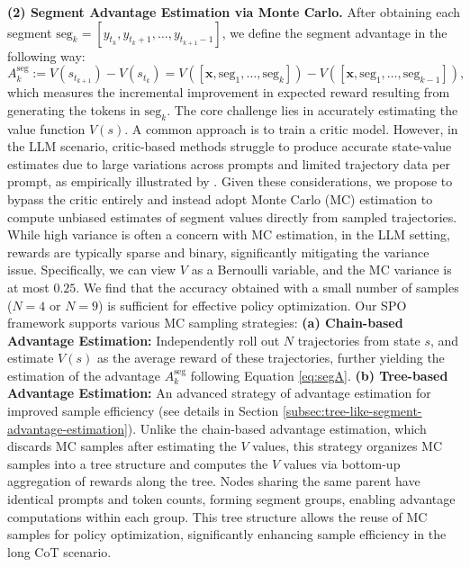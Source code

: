 \textbf{(2) Segment Advantage Estimation via Monte Carlo.} 
After obtaining each segment \(\text{seg}_k= [y_{t_k}, y_{t_k+1}, \dots, y_{t_{k+1}-1}]\), we define the segment advantage in the following way:
\begin{equation}
\label{eq:segA}
A_k^{\mathrm{seg}} := V(s_{t_{k+1}}) - V(s_{t_k})= V([\boldsymbol x,\text{seg}_1,\dots, \text{seg}_{k}]) - V([\boldsymbol x,\text{seg}_1,\dots, \text{seg}_{k-1}]),    
\end{equation}
which measures the incremental improvement in expected reward resulting from generating the tokens in \(\text{seg}_k\). The core challenge lies in accurately estimating the value function \(V(s)\). A common approach is to train a critic model. However, in the LLM scenario, critic-based methods struggle to produce accurate state-value estimates due to large variations across prompts and limited trajectory data per prompt, as empirically illustrated by \cite{kazemnejad2024vineppounlockingrlpotential}. Given these considerations, we propose to bypass the critic entirely and instead adopt Monte Carlo (MC) estimation to compute unbiased estimates of segment values directly from sampled trajectories. While high variance is often a concern with MC estimation, in the LLM setting, rewards are typically sparse and binary, significantly mitigating the variance issue. Specifically, we can view \( V \) as a Bernoulli variable, and the MC variance is at most \( 0.25 \). We find that the accuracy obtained with a small number of samples (\( N=4\) or \( N=9 \)) is sufficient for effective policy optimization. Our SPO framework supports various MC sampling strategies: \textbf{(a) Chain-based Advantage Estimation:} Independently roll out \(N\) trajectories from state \( s \), and estimate \( V(s) \) as the average reward of these trajectories, further yielding the estimation of the advantage $A_k^{\mathrm{seg}}$ following Equation \eqref{eq:segA}. \textbf{(b) Tree-based Advantage Estimation:} An advanced strategy of advantage estimation for improved sample efficiency (see details in Section \ref{subsec:tree-like-segment-advantage-estimation}).  Unlike the chain-based advantage estimation, which discards MC samples after estimating the $V$ values, this strategy organizes MC samples into a tree structure and computes the $V$ values via bottom-up aggregation of rewards along the tree. Nodes sharing the same parent have identical prompts and token counts, forming segment groups, enabling advantage computations within each group. This tree structure allows the reuse of MC samples for policy optimization, significantly enhancing sample efficiency in the long CoT scenario.

